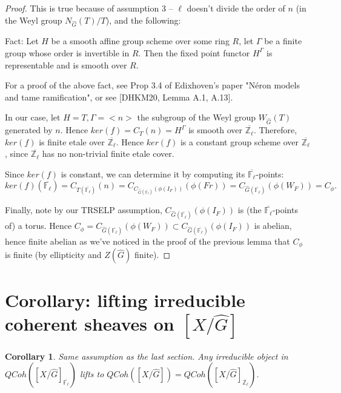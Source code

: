 \documentclass{article}
\newtheorem{corollary}{Corollary}
\begin{document}
	\begin{proof}
		This is true because of assumption 3 -- $\ell$ doesn't divide the order of $n$ (in the Weyl group $N_{\hat{G}}(T)/T$), and the following:
		
		Fact: Let $H$ be a smooth affine group scheme over some ring $R$, let $\Gamma$ be a finite group whose order is invertible in $R$. Then the fixed point functor $H^{\Gamma}$ is representable and is smooth over $R$.
		
		For a proof of the above fact, see Prop 3.4 of Edixhoven's paper "Néron models and tame ramification", or see [DHKM20, Lemma A.1, A.13].
		
		In our case, let $H=T, \Gamma=<n>$ the subgroup of the Weyl group $W_{\hat{G}}(T)$ generated by $n$. Hence $ker(f)=C_{T}(n)=H^{\Gamma}$ is smooth over $\overline{\mathbb{Z}_{\ell}}$. Therefore, $ker(f)$ is finite etale over $\overline{\mathbb{Z}_{\ell}}$. Hence $ker(f)$ is a constant group scheme over $\overline{\mathbb{Z}_{\ell}}$, since $\overline{\mathbb{Z}_{\ell}}$ has no non-trivial finite etale cover. 
		
		Since $ker(f)$ is constant, we can determine it by computing its $\overline{\mathbb{F}_{\ell}}$-points: $$ker(f)(\overline{\mathbb{F}_{\ell}})=C_{T(\overline{\mathbb{F}_{\ell}})}(n)=C_{C_{\hat{G}(\overline{\mathbb{F}_{\ell}})}(\phi(I_F))}(\phi(Fr))=C_{\hat{G}(\overline{\mathbb{F}_{\ell}})}(\phi(W_F))=C_{\phi}.$$
		
		Finally, note by our TRSELP assumption, $C_{\hat{G}(\overline{\mathbb{F}_{\ell}})}(\phi(I_F))$ is (the $\overline{\mathbb{F}_{\ell}}$-points of) a torus. Hence $C_\phi=C_{\hat{G}(\overline{\mathbb{F}_{\ell}})}(\phi(W_F)) \subset C_{\hat{G}(\overline{\mathbb{F}_{\ell}})}(\phi(I_F))$ is abelian, hence finite abelian as we've noticed in the proof of the previous lemma that $C_{\phi}$ is finite (by ellipticity and $Z(\hat{G})$ finite).
	\end{proof}
	
	\section{Corollary: lifting irreducible coherent sheaves on $[X/\hat{G}]$}
	\begin{corollary}
		Same assumption as the last section. Any irreducible object in $QCoh([X/\hat{G}]_{\overline{\mathbb{F}_{\ell}}})$ lifts to $QCoh([X/\hat{G}])=QCoh([X/\hat{G}]_{\overline{\mathbb{Z}_{\ell}}})$.
	\end{corollary}
	
\end{document}
